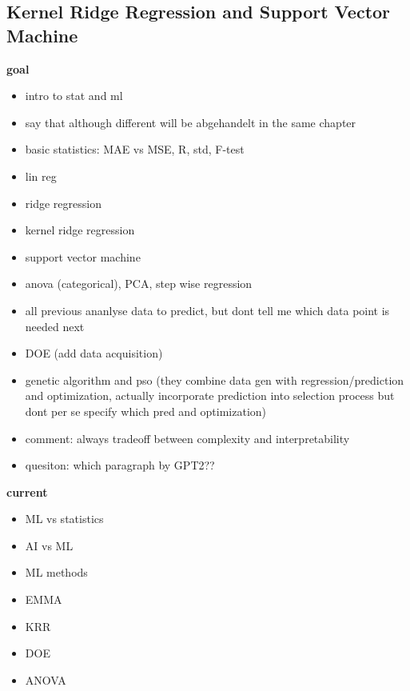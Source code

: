 \subsection{Kernel Ridge Regression and Support Vector Machine}
\textbf{goal}
\begin{itemize}
    \item intro to stat and ml 
    \item say that although different will be abgehandelt in the same chapter 
    \item basic statistics: MAE vs MSE, R, std, F-test 
    \item lin reg 
    \item ridge regression 
    \item kernel ridge regression 
    \item support vector machine 
    \item anova (categorical), PCA, step wise regression
    \item all previous ananlyse data to predict, but dont tell me which data point is needed next 
    \item DOE (add data acquisition)
    \item genetic algorithm and pso (they combine data gen with regression/prediction and optimization, actually incorporate prediction into selection process but dont per se specify which pred and optimization)
    \item comment: always tradeoff between complexity and interpretability
    \item quesiton: which paragraph by GPT2?? 
\end{itemize}

\textbf{current}
\begin{itemize}
    \item ML vs statistics
    \item AI vs ML 
    \item ML methods
    \item EMMA 
    \item KRR 
    \item DOE
    \item ANOVA
\end{itemize}
\fi



